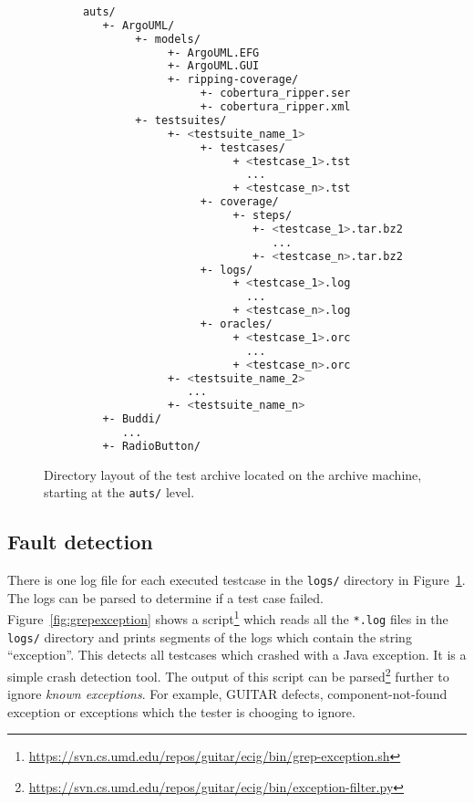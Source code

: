 \begin{figure}
\scriptsize{
   \begin{lstlisting}[language=sh, showstringspaces=false, breaklines=true]
  
      auts/
         +- ArgoUML/
              +- models/
                   +- ArgoUML.EFG
                   +- ArgoUML.GUI
                   +- ripping-coverage/
                        +- cobertura_ripper.ser
                        +- cobertura_ripper.xml
              +- testsuites/
                   +- <testsuite_name_1>
                        +- testcases/
                             + <testcase_1>.tst
                               ...
                             + <testcase_n>.tst
                        +- coverage/
                             +- steps/
                                +- <testcase_1>.tar.bz2
                                   ...
                                +- <testcase_n>.tar.bz2
                        +- logs/
                             + <testcase_1>.log
                               ...
                             + <testcase_n>.log
                        +- oracles/
                             + <testcase_1>.orc
                               ...
                             + <testcase_n>.orc
                   +- <testsuite_name_2>
                      ...
                   +- <testsuite_name_n>
         +- Buddi/
            ...
         +- RadioButton/
   \end{lstlisting}
}

\caption{Directory layout of the test archive located on the archive machine, starting at the \texttt{auts/} level.}
\label{fig:archivelayout}
\end{figure}


\subsection{Fault detection}
\label{sec:faultdetection}

There is one log file for each executed testcase in the \texttt{logs/} directory in Figure~\ref{fig:archivelayout}. The logs can be parsed to determine if a test case failed. Figure~\ref{fig:grepexception} shows a script\footnote{\url{https://svn.cs.umd.edu/repos/guitar/ecig/bin/grep-exception.sh}} which reads all the \texttt{*.log} files in the \texttt{logs/} directory and prints segments of the logs which contain the string ``exception''. This detects all testcases which crashed with a Java exception. It is a simple crash detection tool. The output of this script can be parsed\footnote{\url{https://svn.cs.umd.edu/repos/guitar/ecig/bin/exception-filter.py}} further to ignore \textit{known exceptions}. For example, GUITAR defects, component-not-found exception or exceptions which the tester is chooging to ignore.


